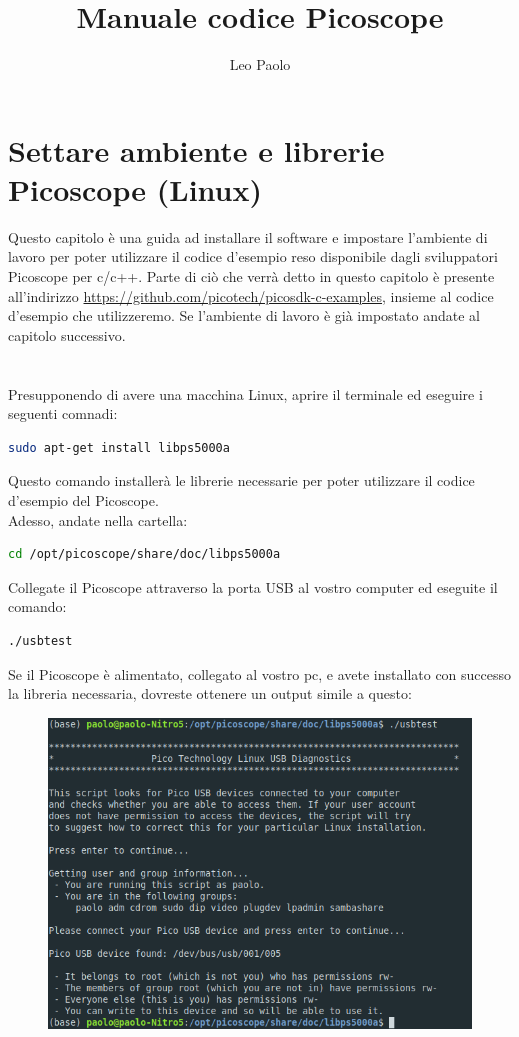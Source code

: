 \documentclass[a4paper]{article}
\begin{document}
\author{Leo Paolo}
\title{Manuale codice Picoscope}
\maketitle

\section{Settare ambiente e librerie Picoscope (Linux)}
Questo capitolo è una guida ad installare il software e impostare l'ambiente di lavoro per poter utilizzare il codice d'esempio reso disponibile dagli sviluppatori Picoscope per c/c++. Parte di ciò che verrà detto in questo capitolo è presente all'indirizzo \url{https://github.com/picotech/picosdk-c-examples}, insieme al codice d'esempio che utilizzeremo. Se l'ambiente di lavoro è già impostato andate al capitolo successivo. \\
\\
\\
\noindent Presupponendo di avere una macchina Linux, aprire il terminale ed eseguire i seguenti comnadi:
\begin{lstlisting}[language=bash]
sudo apt-get install libps5000a
\end{lstlisting}
Questo comando installerà le librerie necessarie per poter utilizzare il codice d'esempio del Picoscope.\\
\noindent Adesso, andate nella cartella:
\begin{lstlisting}[language=bash]
cd /opt/picoscope/share/doc/libps5000a
\end{lstlisting}
Collegate il Picoscope attraverso la porta USB al vostro computer ed eseguite il comando:
\begin{lstlisting}[language=bash]
./usbtest
\end{lstlisting}
Se il Picoscope è alimentato, collegato al vostro pc, e avete installato con successo la libreria necessaria, dovreste ottenere un output simile a questo:
\begin{figure}[h!]
\centering
\includegraphics[scale=0.26]{Immagini/usbtest.png}
\end{figure}
\end{document}
